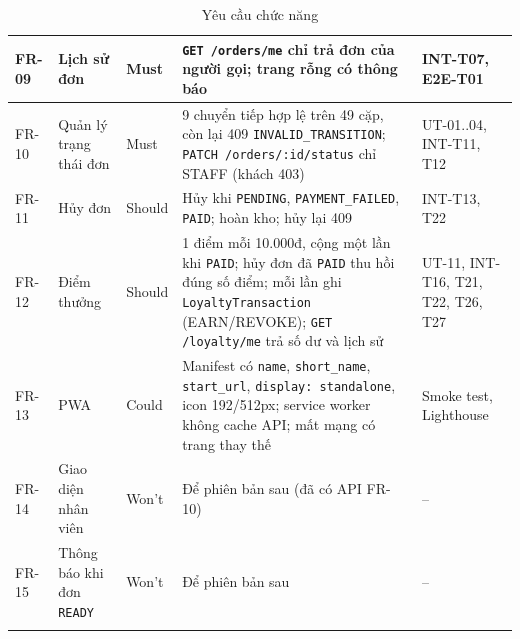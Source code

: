 \documentclass[a4paper]{article}
\newcommand{\st}[1]{\texttt{#1}}
\begin{document}
{\begin{longtable}{|L{1.1cm}|L{3.3cm}|L{1.15cm}|L{6.6cm}|L{2.2cm}|}
FR-09 & Lịch sử đơn & Must & \st{GET /orders/me} chỉ trả đơn của người gọi; trang rỗng có thông báo & INT-T07, E2E-T01 \\ \hline
FR-10 & Quản lý trạng thái đơn & Must & 9 chuyển tiếp hợp lệ trên 49 cặp, còn lại 409 \st{INVALID\_TRANSITION}; \st{PATCH /orders/:id/status} chỉ STAFF (khách 403) & UT-01..04, INT-T11, T12 \\ \hline
FR-11 & Hủy đơn & Should & Hủy khi \st{PENDING}, \st{PAYMENT\_FAILED}, \st{PAID}; hoàn kho; hủy lại 409 & INT-T13, T22 \\ \hline
FR-12 & Điểm thưởng & Should & 1 điểm mỗi 10.000đ, cộng một lần khi \st{PAID}; hủy đơn đã \st{PAID} thu hồi đúng số điểm; mỗi lần ghi \st{LoyaltyTransaction} (EARN/REVOKE); \st{GET /loyalty/me} trả số dư và lịch sử & UT-11, INT-T16, T21, T22, T26, T27 \\ \hline
FR-13 & PWA & Could & Manifest có \st{name}, \st{short\_name}, \st{start\_url}, \st{display: standalone}, icon 192/512px; service worker không cache API; mất mạng có trang thay thế & Smoke test, Lighthouse \\ \hline
FR-14 & Giao diện nhân viên & Won't & Để phiên bản sau (đã có API FR-10) & -- \\ \hline
FR-15 & Thông báo khi đơn \st{READY} & Won't & Để phiên bản sau & -- \\ \hline
\caption{Yêu cầu chức năng}
\end{longtable}

}
\end{document}
